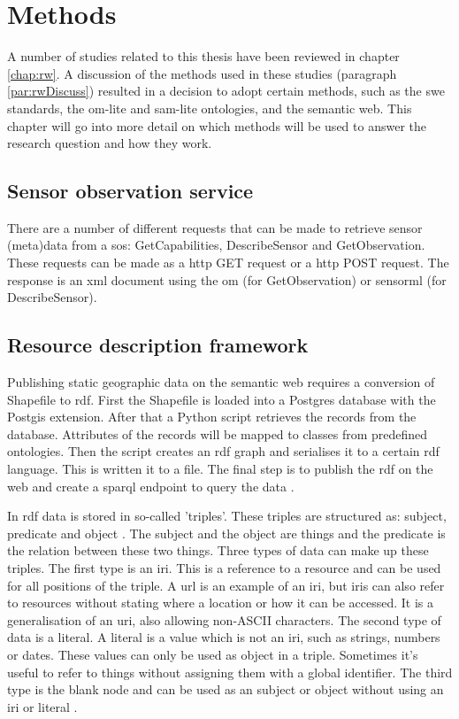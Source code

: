 

\section{Methods}
\label{chap:methods}

A number of studies related to this thesis have been reviewed in chapter \ref{chap:rw}. A discussion of the methods used in these studies (paragraph \ref{par:rwDiscuss}) resulted in a decision to adopt certain methods, such as the \ac{swe} standards, the om-lite and sam-lite ontologies, and the semantic web. This chapter will go into more detail on which methods will be used to answer the research question and how they work.  

\subsection{Sensor observation service}
There are a number of different requests that can be made to retrieve sensor (meta)data from a \ac{sos}: GetCapabilities, DescribeSensor and GetObservation. These requests can be made as a \ac{http} GET request or a \ac{http} POST request. The response is an \ac{xml} document using the \ac{om} (for GetObservation) or \ac{sensorml} (for DescribeSensor).

\subsection{Resource description framework}
Publishing static geographic data on the semantic web requires a conversion of Shapefile to \ac{rdf}. First the Shapefile is loaded into a Postgres database with the Postgis extension. After that a Python script retrieves the records from the database. Attributes of the records will be mapped to classes from predefined ontologies. Then the script creates an \ac{rdf} graph and serialises it to a certain \ac{rdf} language. This is written it to a file. The final step is to publish the \ac{rdf} on the web and create a \ac{sparql} endpoint to query the data \citep{LD:Missier}. 

In \ac{rdf} data is stored in so-called 'triples'. These triples are structured as: subject, predicate and object \cite{LD:Berners-lee}. The subject and the object are things and the predicate is the relation between these two things. Three types of data can make up these triples. The first type is an \ac{iri}. This is a reference to a resource and can be used for all positions of the triple. A \ac{url} is an example of an \ac{iri}, but \ac{iri}s can also refer to resources without stating where a location or how it can be accessed. It is a generalisation of an \ac{uri}, also allowing non-ASCII characters. The second type of data is a literal. A literal is a value which is not an \ac{iri}, such as strings, numbers or dates. These values can only be used as object in a triple. Sometimes it's useful to refer to things without assigning them with a global identifier. The third type is the blank node and can be used as an subject or object without using an \ac{iri} or literal \citep{LD:W3C6}. 

